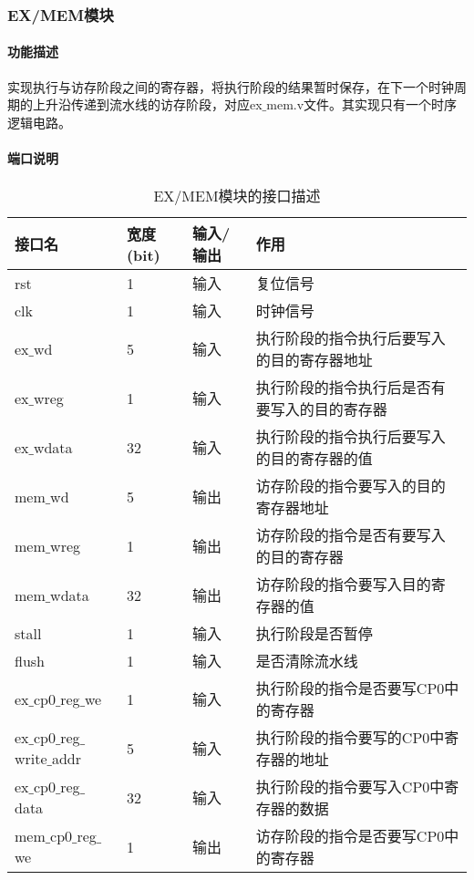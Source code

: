 \subsubsection{EX/MEM模块}
\paragraph{功能描述}
\quad

\quad

实现执行与访存阶段之间的寄存器，将执行阶段的结果暂时保存，在下一个时钟周期的上升沿传递到流水线的访存阶段，对应ex$\_$mem.v文件。其实现只有一个时序逻辑电路。
\paragraph{端口说明}
\quad

\quad
\begin{table}[H]
	\centering
	\caption{EX/MEM模块的接口描述}
	\begin{tabular}{|l|l|l|l|}
		\hline
		接口名 & 宽度(bit) & 输入/输出 & 作用 \\
		\hline
		rst & 1 & 输入 & 复位信号 \\
		\hline
		clk & 1 & 输入 & 时钟信号 \\
		\hline
		ex$\_$wd & 5 & 输入 & 执行阶段的指令执行后要写入的目的寄存器地址 \\
		\hline
		ex$\_$wreg & 1 & 输入 & 执行阶段的指令执行后是否有要写入的目的寄存器 \\
		\hline
		ex$\_$wdata & 32 & 输入 & 执行阶段的指令执行后要写入的目的寄存器的值 \\
		\hline
		mem$\_$wd & 5 & 输出 & 访存阶段的指令要写入的目的寄存器地址 \\
		\hline
		mem$\_$wreg & 1 & 输出 & 访存阶段的指令是否有要写入的目的寄存器 \\
		\hline
		mem$\_$wdata & 32 & 输出 & 访存阶段的指令要写入目的寄存器的值 \\
		\hline
		stall & 1 & 输入 & 执行阶段是否暂停 \\
		\hline
		flush & 1 & 输入 & 是否清除流水线 \\
		\hline
		ex$\_$cp0$\_$reg$\_$we & 1 & 输入 & 执行阶段的指令是否要写CP0中的寄存器 \\
		\hline
		ex$\_$cp0$\_$reg$\_$write$\_$addr & 5 & 输入 & 执行阶段的指令要写的CP0中寄存器的地址 \\
		\hline
		ex$\_$cp0$\_$reg$\_$data & 32 & 输入 & 执行阶段的指令要写入CP0中寄存器的数据 \\
		\hline
		mem$\_$cp0$\_$reg$\_$we & 1 & 输出 & 访存阶段的指令是否要写CP0中的寄存器 \\

\end{tabular}
\end{table}
